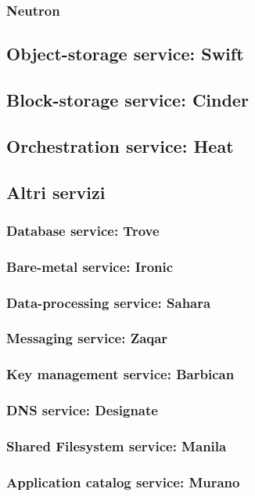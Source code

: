 \subsubsection{Neutron}
\subsection{Object-storage service: Swift}
\subsection{Block-storage service: Cinder}
\subsection{Orchestration service: Heat}
\subsection{Altri servizi} 
\subsubsection{Database service: Trove}
\subsubsection{Bare-metal service: Ironic}
\subsubsection{Data-processing service: Sahara}
\subsubsection{Messaging service: Zaqar}
\subsubsection{Key management service: Barbican}
\subsubsection{DNS service: Designate}
\subsubsection{Shared Filesystem service: Manila}
\subsubsection{Application catalog service: Murano}
